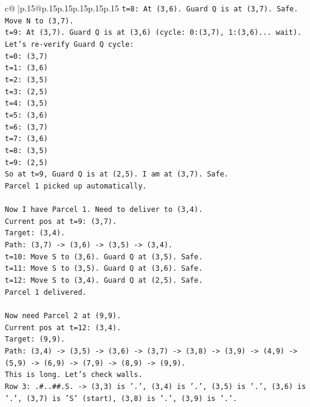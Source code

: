 \documentclass{article}
\begin{document}
{\begin{supertabular}{c@{$\;$}|p{.15\linewidth}@{}p{.15\linewidth}p{.15\linewidth}p{.15\linewidth}p{.15\linewidth}p{.15\linewidth}}
{{{\texttt{t=8: At (3,6). Guard Q is at (3,7). Safe.} \\
\texttt{Move N to (3,7).} \\
\texttt{t=9: At (3,7). Guard Q is at (3,6) (cycle: 0:(3,7), 1:(3,6)... wait).} \\
\texttt{Let's re{-}verify Guard Q cycle:} \\
\texttt{t=0: (3,7)} \\
\texttt{t=1: (3,6)} \\
\texttt{t=2: (3,5)} \\
\texttt{t=3: (2,5)} \\
\texttt{t=4: (3,5)} \\
\texttt{t=5: (3,6)} \\
\texttt{t=6: (3,7)} \\
\texttt{t=7: (3,6)} \\
\texttt{t=8: (3,5)} \\
\texttt{t=9: (2,5)} \\
\texttt{So at t=9, Guard Q is at (2,5). I am at (3,7). Safe.} \\
\texttt{Parcel 1 picked up automatically.} \\
\\ 
\texttt{Now I have Parcel 1. Need to deliver to (3,4).} \\
\texttt{Current pos at t=9: (3,7).} \\
\texttt{Target: (3,4).} \\
\texttt{Path: (3,7) {-}> (3,6) {-}> (3,5) {-}> (3,4).} \\
\texttt{t=10: Move S to (3,6). Guard Q at (3,5). Safe.} \\
\texttt{t=11: Move S to (3,5). Guard Q at (3,6). Safe.} \\
\texttt{t=12: Move S to (3,4). Guard Q at (2,5). Safe.} \\
\texttt{Parcel 1 delivered.} \\
\\ 
\texttt{Now need Parcel 2 at (9,9).} \\
\texttt{Current pos at t=12: (3,4).} \\
\texttt{Target: (9,9).} \\
\texttt{Path: (3,4) {-}> (3,5) {-}> (3,6) {-}> (3,7) {-}> (3,8) {-}> (3,9) {-}> (4,9) {-}> (5,9) {-}> (6,9) {-}> (7,9) {-}> (8,9) {-}> (9,9).} \\
\texttt{This is long. Let's check walls.} \\
\texttt{Row 3: .\#..\#\#.S. {-}> (3,3) is '.', (3,4) is '.', (3,5) is '.', (3,6) is '.', (3,7) is 'S' (start), (3,8) is '.', (3,9) is '.'.} \\
}}}
\end{supertabular}}
\end{document}
